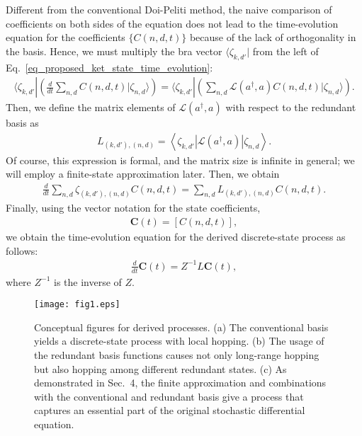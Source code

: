 \documentclass[sn-mathphys,Numbered]{sn-jnl}%
\theoremstyle{thmstyleone}%
\theoremstyle{thmstyletwo}%
\theoremstyle{thmstylethree}%
\begin{document}
Different from the conventional Doi-Peliti method, the naive comparison of coefficients on both sides of the equation does not lead to the time-evolution equation for the coefficients $\{C(n,d,t)\}$ because of the lack of orthogonality in the basis. Hence, we must multiply the bra vector $\langle \zeta_{k,d'} |$ from the left of Eq.~\eqref{eq_proposed_ket_state_time_evolution}:
\begin{align}
\langle \zeta_{k,d'} | \left( \frac{d}{dt} \sum_{n,d}  C(n,d,t) | \zeta_{n,d} \rangle \right) 
= \langle \zeta_{k,d'} | \left( \sum_{n,d} \mathcal{L}\left( a^\dagger, a\right)  C(n,d,t)  | \zeta_{n,d} \rangle\right).
\end{align}
Then, we define the matrix elements of $\mathcal{L}\left( a^\dagger, a\right)$ with respect to the redundant basis as
\begin{align}
L_{(k,d'),(n,d)} = \left\langle \zeta_{k,d'} \left| \mathcal{L}\left( a^\dagger, a\right)  \right| \zeta_{n,d} \right\rangle.
\label{eq_definition_L}
\end{align}
Of course, this expression is formal, and the matrix size is infinite in general; we will employ a finite-state approximation later. Then, we obtain 
\begin{align}
\frac{d}{dt} \sum_{n,d} \zeta_{(k,d'),(n,d)} C(n,d,t) = \sum_{n,d} L_{(k,d'),(n,d)} C(n,d,t).
\end{align}
Finally, using the vector notation for the state coefficients,
\begin{align}
\bm{C}(t) = \left[C(n,d,t) \right],
\end{align}
we obtain the time-evolution equation for the derived discrete-state process as follows:
\begin{align}
\frac{d}{dt} \bm{C}(t) = Z^{-1} L  \bm{C}(t),
\label{eq_redundant_time_evolution_final}
\end{align}
where $Z^{-1}$ is the inverse of $Z$.

\begin{figure}[tb]
  \centering
  \texttt{[image: fig1.eps]}
  \caption{
Conceptual figures for derived processes. (a) The conventional basis yields a discrete-state process with local hopping. (b) The usage of the redundant basis functions causes not only long-range hopping but also hopping among different redundant states. (c) As demonstrated in Sec.~4, the finite approximation and combinations with the conventional and redundant basis give a process that captures an essential part of the original stochastic differential equation.
}
  \label{fig_discrete_process_from_redundant_basis}
\end{figure}
\end{document}
